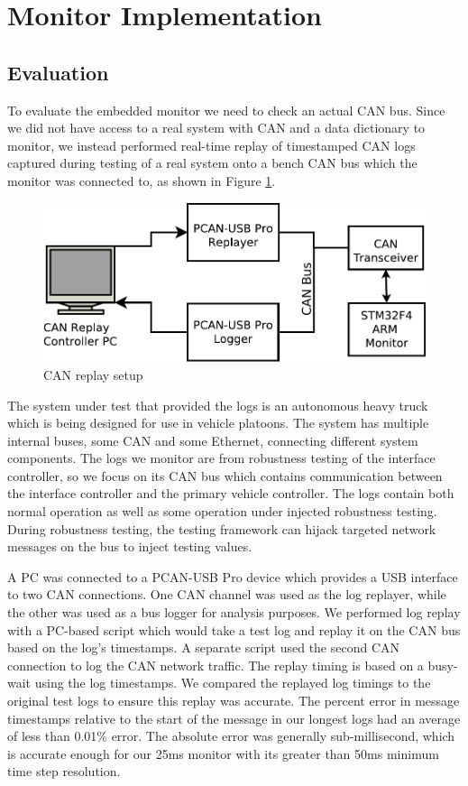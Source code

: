 
\section{Monitor Implementation}
\subsection{Evaluation}
\label{sec:eval:embedded}
To evaluate the embedded monitor we need to check an actual CAN bus.  Since we did not have access to a real system with CAN and a data dictionary to monitor, we instead performed real-time replay of timestamped CAN logs captured during testing of a real system onto a bench CAN bus which the monitor was connected to, as shown in Figure \ref{fig:eval:replaySchem}. 

\begin{figure}
\centering
\includegraphics[width=4.5in]{img/replay_arch}
\caption{CAN replay setup \label{fig:eval:replaySchem}}
\end{figure}
The system under test that provided the logs is an autonomous heavy truck which is being designed for use in vehicle platoons. %
The system has multiple internal buses, some CAN and some Ethernet, connecting different system components. The logs we monitor are from robustness testing of the interface controller, so we focus on its CAN bus which contains communication between the interface controller and the primary vehicle controller.
The logs contain both normal operation as well as some operation under injected robustness testing. During robustness testing, the testing framework can hijack targeted network messages on the bus to inject testing values. %

A PC was connected to a PCAN-USB Pro \cite{PCAN-USBPro} device which provides a USB interface to two CAN connections. One CAN channel was used as the log replayer, while the other was used as a bus logger for analysis purposes.
We performed log replay with a PC-based script which would take a test log and replay it on the CAN bus based on the log's timestamps. A separate script used the second CAN connection to log the CAN network traffic.
The replay timing is based on a busy-wait using the log timestamps. 
We compared the replayed log timings to the original test logs to ensure this replay was accurate. 
The percent error in message timestamps relative to the start of the message in our longest logs had an average of less than 0.01\% error. The absolute error was generally sub-millisecond, which is accurate enough for our 25ms monitor with its greater than 50ms minimum time step resolution.

